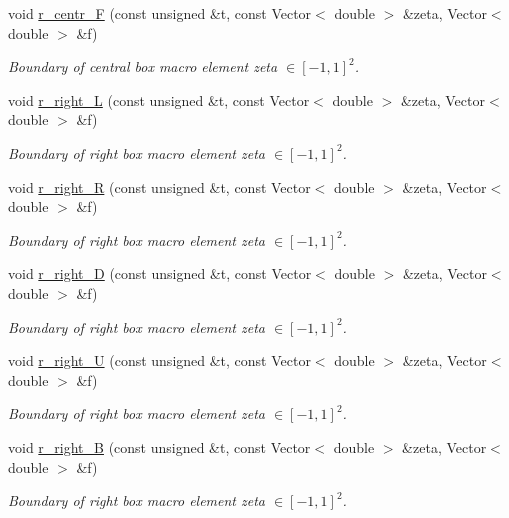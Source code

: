 \begin{DoxyCompactItemize}
void \hyperlink{classoomph_1_1EighthSphereDomain_a080334e0a4e7cd61c97f0b2bf1174f00}{r\+\_\+centr\+\_\+F} (const unsigned \&t, const Vector$<$ double $>$ \&zeta, Vector$<$ double $>$ \&f)
\begin{DoxyCompactList}\small\item\em Boundary of central box macro element zeta $ \in [-1,1]^2 $. \end{DoxyCompactList}\item 
void \hyperlink{classoomph_1_1EighthSphereDomain_ad029a857dd1b83ed10281613e0c56800}{r\+\_\+right\+\_\+L} (const unsigned \&t, const Vector$<$ double $>$ \&zeta, Vector$<$ double $>$ \&f)
\begin{DoxyCompactList}\small\item\em Boundary of right box macro element zeta $ \in [-1,1]^2 $. \end{DoxyCompactList}\item 
void \hyperlink{classoomph_1_1EighthSphereDomain_a58ec95dc35f526fe5c6baa2578a2f786}{r\+\_\+right\+\_\+R} (const unsigned \&t, const Vector$<$ double $>$ \&zeta, Vector$<$ double $>$ \&f)
\begin{DoxyCompactList}\small\item\em Boundary of right box macro element zeta $ \in [-1,1]^2 $. \end{DoxyCompactList}\item 
void \hyperlink{classoomph_1_1EighthSphereDomain_a7a4a1a98b542afd49a5ec8abfda287fc}{r\+\_\+right\+\_\+D} (const unsigned \&t, const Vector$<$ double $>$ \&zeta, Vector$<$ double $>$ \&f)
\begin{DoxyCompactList}\small\item\em Boundary of right box macro element zeta $ \in [-1,1]^2 $. \end{DoxyCompactList}\item 
void \hyperlink{classoomph_1_1EighthSphereDomain_a004a1adfe832e2b233f8ec1b6a58b9aa}{r\+\_\+right\+\_\+U} (const unsigned \&t, const Vector$<$ double $>$ \&zeta, Vector$<$ double $>$ \&f)
\begin{DoxyCompactList}\small\item\em Boundary of right box macro element zeta $ \in [-1,1]^2 $. \end{DoxyCompactList}\item 
void \hyperlink{classoomph_1_1EighthSphereDomain_ac013c364bfe2f0bb1d3393696149d249}{r\+\_\+right\+\_\+B} (const unsigned \&t, const Vector$<$ double $>$ \&zeta, Vector$<$ double $>$ \&f)
\begin{DoxyCompactList}\small\item\em Boundary of right box macro element zeta $ \in [-1,1]^2 $. \end{DoxyCompactList}\item 

\end{DoxyCompactItemize}
